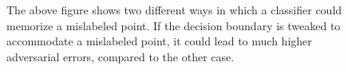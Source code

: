 \documentclass[12pt, oneside]{book}
\begin{document}
\begin{figure}[!h]
    \centering
    \qquad
    \caption{The above figure shows two different ways in which a classifier
    could memorize a mislabeled point. If the decision boundary is tweaked to
    accommodate a mislabeled point, it could lead to much higher adversarial
    errors, compared to the other case.}
    \label{fig:pockets-or-tweaks}

\end{figure}
\end{document}
